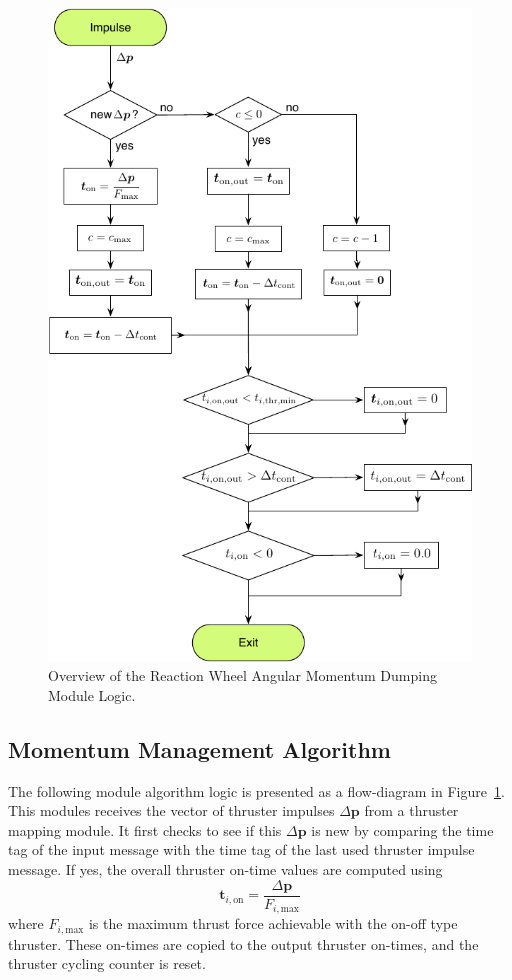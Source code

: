 \documentclass[]{BasiliskReportMemo}
\begin{document}
\begin{figure}[!t]
	\centerline{
	\includegraphics[]{Figures/rwMomentumDumping}
	}
	\caption{Overview of the Reaction Wheel Angular Momentum Dumping Module Logic.}
	\label{fig:Fig2}
\end{figure}


\subsection{Momentum Management Algorithm}
The following module algorithm logic is presented as a flow-diagram in Figure~\ref{fig:Fig2}.  This modules receives the vector of thruster impulses $\Delta\bm p$ from a thruster mapping module.  It first checks to see if this $\Delta\bm p$ is new by comparing the time tag of the input message with the time tag of the last used thruster impulse message.  If yes,  the overall thruster on-time values are computed using
\begin{equation}
	\bm t_{i,\text{on}} = \frac{\Delta \bm p}{F_{i,\text{max}}}
\end{equation}
where $F_{i,\text{max}}$ is the maximum thrust force achievable with the on-off type thruster.  These on-times are copied to the output thruster on-times, and the thruster cycling counter is reset.  
\end{document}
